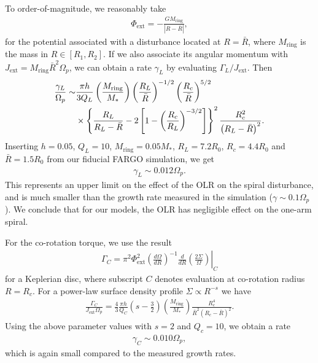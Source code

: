 To order-of-magnitude, we reasonably take
\begin{align}
  \Phi_\mathrm{ext} = -\frac{GM_\mathrm{ring}}{|R - \bar{R}|}, 
\end{align}
for the potential associated with a disturbance located at
$R=\bar{R}$, where $M_\mathrm{ring}$ is the mass in $R\in[R_1,R_2]$.
If we also associate its angular momentum with 
$J_\mathrm{ext}  = M_\mathrm{ring}\bar{R}^2\Omega_p$, we can obtain a
rate $\gamma_L$ by evaluating $\Gamma_L/J_\mathrm{ext}$. Then 
\begin{align}
  \frac{\gamma_L}{\Omega_p} \sim &\frac{\pi h}{3
    Q_L}\left(\frac{M_\mathrm{ring}}{M_*}\right)\left(\frac{R_L}{\bar{R}}\right)^{-1/2}\left(\frac{R_c}{\bar{R}}\right)^{5/2}\notag\\
  &\times \left\{ \frac{R_L}{R_L - \bar{R}} - 2\left[1 -
      \left(\frac{R_c}{R_L}\right)^{-3/2}\right]\right\}^2\frac{R_c^2}{\left(R_L
    - \bar{R}\right)^2}. 
\end{align}
Inserting $h=0.05$, $Q_L=10$, $M_\mathrm{ring} = 0.05M_*$,
$R_L=7.2R_0$, $R_c=4.4R_0$ and $\bar{R}=1.5R_0$ from our fiducial
FARGO simulation, we get
\begin{align}
  \gamma_L \sim 0.012\Omega_p. 
\end{align}
This represents an upper limit on the effect of the OLR on the spiral
disturbance, and is much smaller than the growth rate measured in the
simulation ($\gamma\sim0.1\Omega_p$). We conclude that for our models,
the OLR has negligible effect on the one-arm spiral. 

For the co-rotation torque, we use the result
\begin{align}
  \Gamma_C = \left.
    \pi^2\Phi_\mathrm{ext}^2\left(\frac{d\Omega}{dR}\right)^{-1}\frac{d}{dR}\left(\frac{2\Sigma}{\Omega}\right)\right|_{C}
\end{align}
for a Keplerian disc, where subscript $C$ denotes evaluation at
co-rotation radius $R=R_c$. For a power-law surface density profile
$\Sigma\propto R^{-s}$ we have
\begin{align}
  \frac{\Gamma_C}{J_\mathrm{ext}\Omega_p} = \frac{4}{3}\frac{\pi h}{Q_C} \left(s -
    \frac{3}{2}\right)\left(\frac{M_\mathrm{ring}}{M_*}\right)\frac{R_c^4}{\bar{R}^2\left(R_c
      - \bar{R}\right)^2}.   
\end{align}
Using the above parameter values with $s=2$ and $Q_c=10$, we obtain a
rate
\begin{align}
  \gamma_C\sim 0.010\Omega_p,
\end{align}
which is again small compared to the measured growth rates. 

